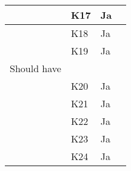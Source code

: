 \documentclass[class=article, crop=false]{standalone}
\begin{document}
\begin{table}[]
\begin{tabular}{|l|l|l|l|}
            & K17            & Ja                 &                                                                                                                                                                                                    \\ \hline
            & K18            & Ja                 &                                                                                                                                                                                                    \\ \hline
            & K19            & Ja                 &                                                                                                                                                                                                    \\ \hline
            Should have     &                &                    &                                                                                                                                                                                                    \\ \hline
            & K20            & Ja                 &                                                                                                                                                                                                    \\ \hline
            & K21            & Ja                 &                                                                                                                                                                                                    \\ \hline
            & K22            & Ja                 &                                                                                                                                                                                                    \\ \hline
            & K23            & Ja                 &                                                                                                                                                                                                    \\ \hline
            & K24            & Ja                 &                                                                                                                                                                                                    \\ \hline

\end{tabular}
\end{table}
\end{document}

